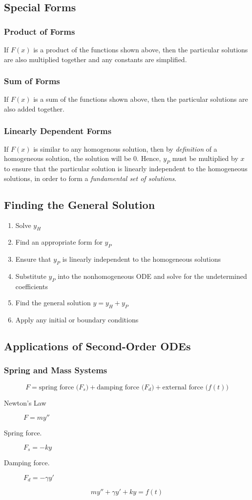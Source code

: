\documentclass{article}
\begin{document}
\subsection{Special Forms}
\subsubsection{Product of Forms}
If $F(x)$ is a product of the functions shown above, then the 
particular solutions are also multiplied together and any constants are simplified.
\subsubsection{Sum of Forms}
If $F(x)$ is a sum of the functions shown above, then the
particular solutions are also added together.
\subsubsection{Linearly Dependent Forms}
If $F(x)$ is similar to any homogenous solution, then by \textit{definition} of
a homogeneous solution, the solution will be $0$. Hence, $y_P$ must be multiplied by $x$
to ensure that the particular solution is linearly independent to the homogeneous solutions,
in order to form a \textit{fundamental set of solutions}.
\subsection{Finding the General Solution}
\begin{enumerate}
    \item Solve $y_H$
    \item Find an appropriate form for $y_P$
    \item Ensure that $y_P$ is linearly independent to the homogeneous solutions
    \item Substitute $y_P$ into the nonhomogeneous ODE and solve for the undetermined coefficients
    \item Find the general solution $y = y_H + y_P$
    \item Apply any initial or boundary conditions
\end{enumerate}
\subsection{Applications of Second-Order ODEs}
\subsubsection{Spring and Mass Systems}
\begin{equation*}
    F = \text{spring force ($F_s$)} + \text{damping force ($F_d$)} + \text{external force ($f(t)$)}
\end{equation*}
\begin{description}
    \item[Newton's Law] $F = m y''$
    \item[Spring force.] $F_s = -k y$
    \item[Damping force.] $F_d = -\gamma y'$
\end{description}
\begin{equation*}
    m y'' + \gamma y' + k y = f(t)
\end{equation*}
\end{document}
